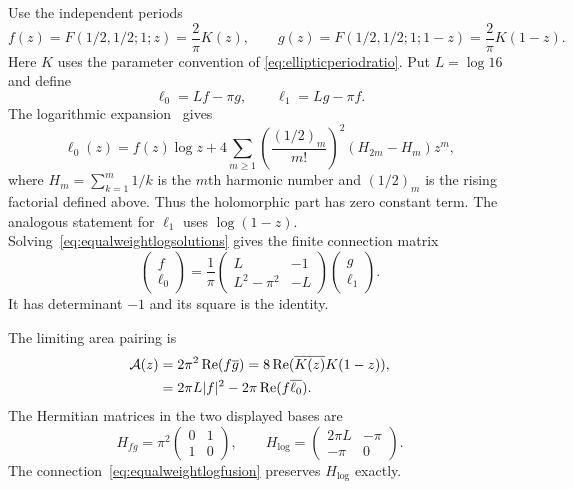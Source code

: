 Use the independent periods
\begin{equation}
 f(z)=F(1/2,1/2;1;z)=\frac2\pi K(z),\qquad
 g(z)=F(1/2,1/2;1;1-z)=\frac2\pi K(1-z).
 \label{eq:equalweightfg}
\end{equation}
Here $K$ uses the parameter convention of
\eqref{eq:ellipticperiodratio}. Put $L=\log16$ and define
\begin{equation}
 \ell_0=Lf-\pi g,\qquad \ell_1=Lg-\pi f.
 \label{eq:equalweightlogsolutions}
\end{equation}
The logarithmic expansion~\cite[Sections~15.10 and 19.12]{DLMF}
gives
\[
 \ell_0(z)=f(z)\log z+
   4\sum_{m\ge1}
    \left(\frac{(1/2)_m}{m!}\right)^2
       (H_{2m}-H_m)z^m,
\]
where $H_m=\sum_{k=1}^m1/k$ is the $m$th harmonic number
and $(1/2)_m$ is the rising factorial defined above. Thus the holomorphic part
has zero constant term. The analogous statement for
$\ell_1$ uses $\log(1-z)$.
Solving~\eqref{eq:equalweightlogsolutions} gives the finite
connection matrix
\begin{equation}
 \boxed{\quad
 \begin{pmatrix}f\\\ell_0\end{pmatrix}
 =\frac1\pi
 \begin{pmatrix}L&-1\\L^2-\pi^2&-L\end{pmatrix}
 \begin{pmatrix}g\\\ell_1\end{pmatrix}.
 \quad}
 \label{eq:equalweightlogfusion}
\end{equation}
It has determinant $-1$ and its square is the identity.

The limiting area pairing is
\begin{align}
 \mathcal A(z)
   &=2\pi^2\operatorname{Re}(f\overline g)
     =8\operatorname{Re}(\overline{K(z)}K(1-z)),
       \label{eq:equalweightareaexact}\\
   &=2\pi L|f|^2-2\pi\operatorname{Re}(f\overline{\ell_0}).
       \notag
\end{align}
The Hermitian matrices in the two displayed bases are
\begin{equation}
 H_{fg}=\pi^2\begin{pmatrix}0&1\\1&0\end{pmatrix},\qquad
 H_{\log}=\begin{pmatrix}2\pi L&-\pi\\-\pi&0\end{pmatrix}.
 \label{eq:equalweightHermitian}
\end{equation}
The connection~\eqref{eq:equalweightlogfusion} preserves
$H_{\log}$ exactly.

